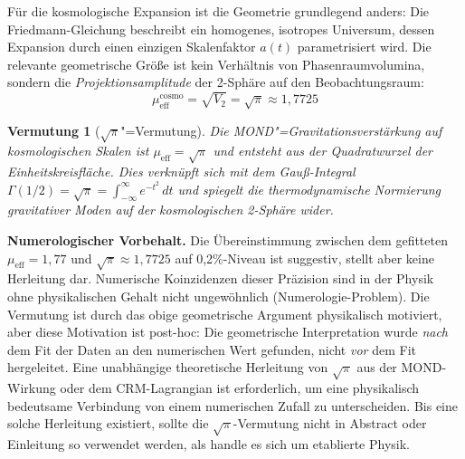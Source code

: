 \documentclass[aps,prd,twocolumn,superscriptaddress,nofootinbib,floatfix]{revtex4-2}
\newtheorem{conjecture}{Vermutung}
\begin{document}
Für die kosmologische Expansion ist die Geometrie grundlegend anders: Die Friedmann-Gleichung beschreibt ein homogenes, isotropes Universum, dessen Expansion durch einen einzigen Skalenfaktor $a(t)$ parametrisiert wird. Die relevante geometrische Größe ist kein Verhältnis von Phasenraumvolumina, sondern die \textit{Projektionsamplitude} der 2-Sphäre auf den Beobachtungsraum:
\begin{equation}
\mu_{\mathrm{eff}}^{\mathrm{cosmo}} = \sqrt{V_2} = \sqrt{\pi} \approx 1{,}7725
\label{eq:mu_cosmo}
\end{equation}

\begin{conjecture}[$\sqrt{\pi}$"=Vermutung]
Die MOND"=Gra\-vi\-ta\-ti\-ons\-ver\-stär\-kung auf kosmologischen Skalen ist $\mu_{\mathrm{eff}} = \sqrt{\pi}$ und entsteht aus der Quadratwurzel der Einheitskreisfläche. Dies verknüpft sich mit dem Gauß-Integral $\Gamma(1/2) = \sqrt{\pi} = \int_{-\infty}^{\infty} e^{-t^2}\,dt$ und spiegelt die thermodynamische Normierung gravitativer Moden auf der kosmologischen 2-Sphäre wider.
\end{conjecture}

\textbf{Numerologischer Vorbehalt.} Die Übereinstimmung zwischen dem gefitteten $\mu_{\mathrm{eff}} = 1{,}77$ und $\sqrt{\pi} \approx 1{,}7725$ auf 0,2\%-Niveau ist suggestiv, stellt aber keine Herleitung dar. Numerische Koinzidenzen dieser Präzision sind in der Physik ohne physikalischen Gehalt nicht ungewöhnlich (Numerologie-Problem). Die Vermutung ist durch das obige geometrische Argument physikalisch motiviert, aber diese Motivation ist post-hoc: Die geometrische Interpretation wurde \emph{nach} dem Fit der Daten an den numerischen Wert gefunden, nicht \emph{vor} dem Fit hergeleitet. Eine unabhängige theoretische Herleitung von $\sqrt{\pi}$ aus der MOND-Wirkung oder dem CRM-Lagrangian ist erforderlich, um eine physikalisch bedeutsame Verbindung von einem numerischen Zufall zu unterscheiden. Bis eine solche Herleitung existiert, sollte die $\sqrt{\pi}$-Vermutung nicht in Abstract oder Einleitung so verwendet werden, als handle es sich um etablierte Physik.
\end{document}
